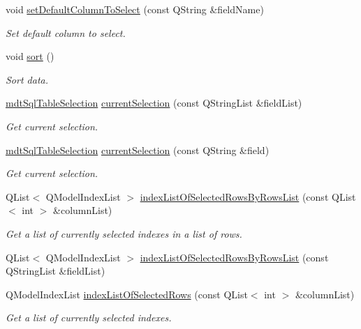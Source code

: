 \begin{DoxyCompactItemize}
void \hyperlink{classmdt_sql_table_widget_a17d60fda061030fdfe15be5445eadc76}{set\-Default\-Column\-To\-Select} (const Q\-String \&field\-Name)
\begin{DoxyCompactList}\small\item\em Set default column to select. \end{DoxyCompactList}\item 
void \hyperlink{classmdt_sql_table_widget_a5e1323816fce33680857048db8cbb255}{sort} ()
\begin{DoxyCompactList}\small\item\em Sort data. \end{DoxyCompactList}\item 
\hyperlink{classmdt_sql_table_selection}{mdt\-Sql\-Table\-Selection} \hyperlink{classmdt_sql_table_widget_a65f1bb0ebf82f73ef4a61e53ec4a26a7}{current\-Selection} (const Q\-String\-List \&field\-List)
\begin{DoxyCompactList}\small\item\em Get current selection. \end{DoxyCompactList}\item 
\hyperlink{classmdt_sql_table_selection}{mdt\-Sql\-Table\-Selection} \hyperlink{classmdt_sql_table_widget_adb4792d2ed64a9cce61bc429986ae9a1}{current\-Selection} (const Q\-String \&field)
\begin{DoxyCompactList}\small\item\em Get current selection. \end{DoxyCompactList}\item 
Q\-List$<$ Q\-Model\-Index\-List $>$ \hyperlink{classmdt_sql_table_widget_af28a5a54efb31c29734fb5b2d7f0e2fa}{index\-List\-Of\-Selected\-Rows\-By\-Rows\-List} (const Q\-List$<$ int $>$ \&column\-List)
\begin{DoxyCompactList}\small\item\em Get a list of currently selected indexes in a list of rows. \end{DoxyCompactList}\item 
Q\-List$<$ Q\-Model\-Index\-List $>$ \hyperlink{classmdt_sql_table_widget_a5abe02dacc9fd8c0c33c27dbc5216d1b}{index\-List\-Of\-Selected\-Rows\-By\-Rows\-List} (const Q\-String\-List \&field\-List)
\item 
Q\-Model\-Index\-List \hyperlink{classmdt_sql_table_widget_a9a43d9a5d2e63189f17d2bce7159e510}{index\-List\-Of\-Selected\-Rows} (const Q\-List$<$ int $>$ \&column\-List)
\begin{DoxyCompactList}\small\item\em Get a list of currently selected indexes. \end{DoxyCompactList}\item 

\end{DoxyCompactItemize}
